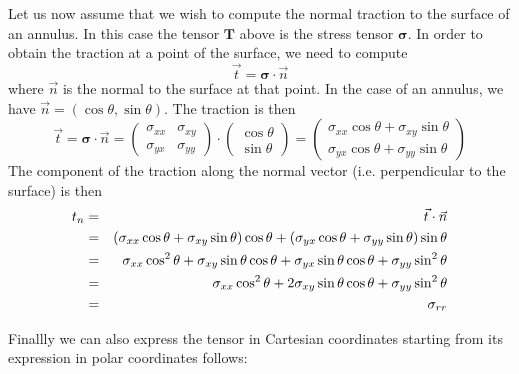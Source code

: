 Let us now assume that we wish to compute the normal traction to the surface of an annulus. 
In this case the tensor ${\bm T}$ above is the stress tensor ${\bm \sigma}$. 
In order to obtain the traction at a point of the surface, we need to compute 
\[
\vec{t}={\bm \sigma}\cdot \vec{n}
\]
where $\vec{n}$ is the normal to the surface at that point. In the case of an 
annulus, we have $\vec{n}=(\cos\theta, \sin\theta)$.
The traction is then 
\[
\vec{t}={\bm \sigma}\cdot \vec{n}
=\left(\begin{array}{cc}
\sigma_{xx} & \sigma_{xy} \\
\sigma_{yx} & \sigma_{yy} 
\end{array}\right)
\cdot
\left(\begin{array}{c}
\cos\theta \\
\sin\theta
\end{array}\right)
=
\left(\begin{array}{c}
\sigma_{xx}\cos\theta +  \sigma_{xy} \sin\theta \\
\sigma_{yx}\cos\theta +  \sigma_{yy} \sin\theta 
\end{array}\right)
\]
The component of the traction along the normal vector (i.e. perpendicular to the surface)
is then 
\begin{eqnarray}
t_n 
&=& \vec{t}\cdot \vec{n} \nonumber\\
&=& 
(\sigma_{xx}\cos\theta +  \sigma_{xy} \sin\theta )\cos\theta
+(\sigma_{yx}\cos\theta +  \sigma_{yy} \sin\theta )\sin\theta \nonumber\\
&=& \sigma_{xx}\cos^2\theta +  \sigma_{xy} \sin\theta \cos\theta 
+ \sigma_{yx}\sin\theta \cos\theta +  \sigma_{yy} \sin^2\theta \nonumber\\
&=& \sigma_{xx}\cos^2\theta +2 \sigma_{xy}\sin\theta \cos\theta + \sigma_{yy} \sin^2\theta \nonumber\\
&=& \sigma_{rr}
\end{eqnarray}

Finallly we can also express the tensor in Cartesian coordinates starting 
from its expression in polar coordinates follows:

